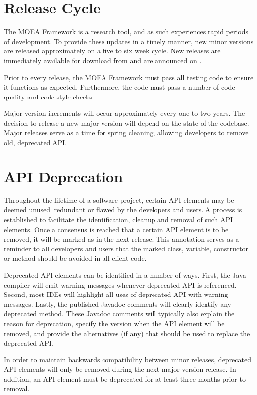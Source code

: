 \section{Release Cycle}
The MOEA Framework is a research tool, and as such experiences rapid periods of development.  To provide these updates in a timely manner, new minor versions are released approximately on a five to six week cycle.  New releases are immediately available for download from  and are announced on .

Prior to every release, the MOEA Framework must pass all testing code to ensure it functions as expected.  Furthermore, the code must pass a number of code quality and code style checks.

Major version increments will occur approximately every one to two years.  The decision to release a new major version will depend on the state of the codebase.  Major releases serve as a time for spring cleaning, allowing developers to remove old, deprecated API.

\section{API Deprecation}
Throughout the lifetime of a software project, certain API elements may be deemed unused, redundant or flawed by the developers and users.  A process is established to facilitate the identification, cleanup and removal of such API elements.  Once a consensus is reached that a certain API element is to be removed, it will be marked as  in the next release.  This annotation serves as a reminder to all developers and users that the marked class, variable, constructor or method should be avoided in all client code.

Deprecated API elements can be identified in a number of ways.  First, the Java compiler will emit warning messages whenever deprecated API is referenced.  Second, most IDEs will highlight all uses of deprecated API with warning messages.  Lastly, the published Javadoc comments will clearly identify any deprecated method.  These Javadoc comments will typically also explain the reason for deprecation, specify the version when the API element will be removed, and provide the alternatives (if any) that should be used to replace the deprecated API.

In order to maintain backwards compatibility between minor releases, deprecated API elements will only be removed during the next major version release.  In addition, an API element must be deprecated for at least three months prior to removal.

